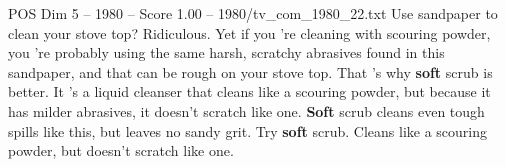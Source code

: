 \begin{textsample}{POS Dim 5 – 1980 – Score 1.00 – 1980/tv\_com\_1980\_22.txt}  \label{ex:f5_pos_019}
Use sandpaper to clean your stove top?
Ridiculous.
Yet if you 're cleaning with scouring powder, you 're probably using the same harsh, scratchy abrasives found in this sandpaper, and that can be rough on your stove top.
That 's why \textbf{soft} scrub is better.
It 's a liquid cleanser that cleans like a scouring powder, but because it has milder abrasives, it doesn't scratch like one. \textbf{Soft} scrub cleans even tough spills like this, but leaves no sandy grit.
Try \textbf{soft} scrub.
Cleans like a scouring powder, but doesn't scratch like one.

\end{textsample}
